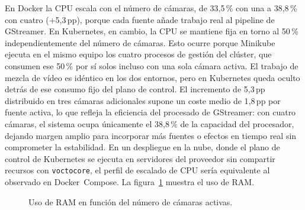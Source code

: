 En Docker la CPU escala con el número de cámaras, de 33{,}5\,\% con una a
38{,}8\,\% con cuatro (+5{,}3\,pp), porque cada fuente añade trabajo real al
pipeline de GStreamer. En Kubernetes, en cambio, la CPU se mantiene
fija en torno al 50\,\% independientemente del número de cámaras. Esto ocurre
porque Minikube ejecuta en el mismo equipo los cuatro procesos de gestión del
clúster, que consumen ese 50\,\% por sí solos incluso con una sola cámara
activa. El trabajo de mezcla de vídeo es idéntico en los dos entornos, pero en
Kubernetes queda oculto detrás de ese consumo fijo del plano de control.
El incremento de 5{,}3\,pp distribuido en tres cámaras adicionales supone un coste medio
de 1{,}8\,pp por fuente activa, lo que refleja la eficiencia del procesado de GStreamer:
con cuatro cámaras, el sistema ocupa únicamente el 38{,}8\,\% de la capacidad del
procesador, dejando margen amplio para incorporar más fuentes o efectos en tiempo real
sin comprometer la estabilidad. En un despliegue en la nube, donde el plano de control
de Kubernetes se ejecuta en servidores del proveedor sin compartir recursos con
\texttt{voctocore}, el perfil de escalado de CPU sería equivalente al observado en
Docker~Compose.
La figura~\ref{fig:ram_camaras} muestra el uso de RAM.

\begin{figure}[H]
  \centering
  \caption{Uso de RAM en función del número de cámaras activas.}
  \label{fig:ram_camaras}
\end{figure}

